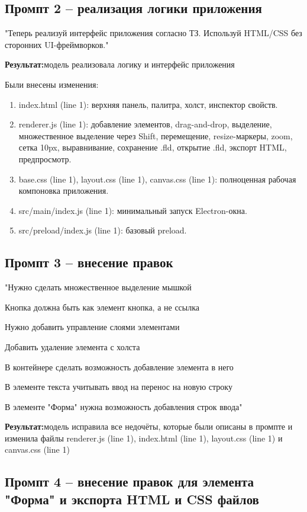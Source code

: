 \documentclass[14pt,a4paper]{extarticle}
\begin{document}
{{\subsection{Промпт 2 -- реализация логики приложения}

"Теперь реализуй интерфейс приложения согласно ТЗ. Используй HTML/CSS без сторонних UI-фреймворков."

\textbf{Результат:}модель реализовала логику и интерфейс приложения

Были внесены изменения:
\begin{enumerate}
    \item index.html (line 1): верхняя панель, палитра, холст, инспектор свойств.
    \item renderer.js (line 1): добавление элементов, drag-and-drop, выделение, множественное выделение через Shift, перемещение, resize-маркеры, zoom, сетка 10px, выравнивание, сохранение .fld, открытие .fld, экспорт HTML, предпросмотр.
    \item base.css (line 1), layout.css (line 1), canvas.css (line 1): полноценная рабочая компоновка приложения.
    \item src/main/index.js (line 1): минимальный запуск Electron-окна.
    \item src/preload/index.js (line 1): базовый preload.
\end{enumerate}

\subsection{Промпт 3 -- внесение правок}

"Нужно сделать множественное выделение мышкой

Кнопка должна быть как элемент кнопка, а не ссылка

Нужно добавить управление слоями элементами

Добавить удаление элемента с холста

В контейнере сделать возможность добавление элемента в него

В элементе текста учитывать ввод на перенос на новую строку

В элементе "Форма" нужна возможность добавления строк ввода"

\textbf{Результат:}модель исправила все недочёты, которые были описаны в промпте и изменила файлы renderer.js (line 1), index.html (line 1), layout.css (line 1) и canvas.css (line 1)

\subsection{Промпт 4 -- внесение правок для элемента "Форма" и экспорта HTML и CSS файлов}

}}
\end{document}
